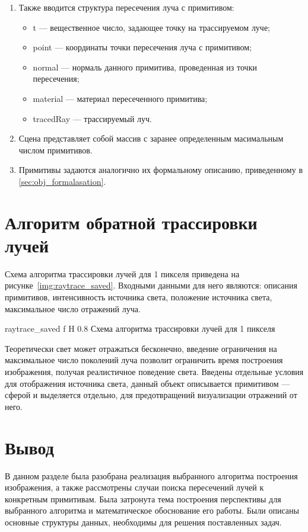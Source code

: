 \begin{enumerate}
	\item  Также вводится структура пересечения луча с примитивом:
	\begin{itemize}
		\item t --- вещественное число, задающее точку на трассируемом луче;
		\item point --- координаты точки пересечения луча с примитивом;
		\item normal --- нормаль данного примитива, проведенная из точки пересечения;
		\item material --- материал пересеченного примитива;
		\item tracedRay --- трассируемый луч.
	\end{itemize}

	\item Сцена представляет собой массив с заранее определенным масимальным числом примитивов.
	\item Примитивы задаются аналогично их формальному описанию, приведенному в \ref{sec:obj_formalasation}.
\end{enumerate}



\section{Алгоритм обратной трассировки лучей}
Схема алгоритма трассировки лучей для 1 пикселя приведена на рисунке~\ref{img:raytrace_saved}. Входными данными для него являются: описания примитивов,
интенсивность источника света, положение источника света, максимальное число отражений луча.


{raytrace_saved} %
{f} %
{H} %
{0.8\textwidth} %
{Схема алгоритма трассировки лучей для 1 пикселя} %

\newpage
Теоретически свет может отражаться бесконечно, введение ограничения на максимальное число поколений луча позволит ограничить время построения изображения,
получая  реалистичное поведение света. Введены отдельные условия для отображения источника света, данный объект описывается примитивом --- сферой и выделяется отдельно,
для предотвращений визуализации отражений от него.












\section*{Вывод}

В данном разделе была разобрана реализация выбранного алгоритма построения изображения, а также рассмотрены случаи поиска пересечений лучей  к конкретным примитивам. 
Была затронута тема построения перспективы для выбранного алгоритма и математическое обоснование его работы. Были описаны основные структуры данных, необходимы для решения поставленных задач.




